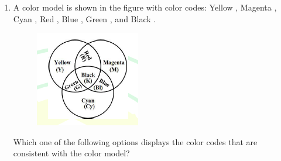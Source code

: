 \documentclass[journal,12pt,onecolumn]{IEEEtran}
\theoremstyle{remark}
\begin{document}
\begin{enumerate}
\begin{enumerate}
\begin{multicols}{2}
\end{multicols}    
\end{enumerate}

\item A color model is shown in the figure with color codes: Yellow , Magenta , Cyan , Red , Blue , Green , and Black .
\begin{figure}[H]
    \centering
    \includegraphics[width=0.5\columnwidth]{figs/fig2.png}
    \caption{}
    \label{fig:q8}
\end{figure}
Which one of the following options displays the color codes that are consistent with the color model? \hfill{}
\begin{enumerate}
\end{enumerate}
\end{enumerate}
\end{document}
